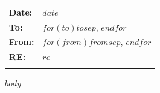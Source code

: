 \documentclass[12pt]{article}
\renewcommand{\arraystretch}{1.5}
\begin{document}
\pagestyle{memopage} %
\thispagestyle{memohead} %

\vspace*{1cm} %
\noindent\begin{tabular}{!{\color{Tan}\vline} p{0.5in} !{\color{Tan}\vline} p{6.15in} !{\color{Tan}\vline}}
  \hline
  \bf{Date:} & {$date$} \\
  \hline
  \bf{To:} & {$for(to)$$to$$sep$, $endfor$} \\
  \hline
  \bf{From:} & {$for(from)$$from$$sep$, $endfor$} \\
  \hline
  \bf{RE:} & {$re$} \\
  \hline
\end{tabular}
\renewcommand{\arraystretch}{1} %

$body$
\end{document}
